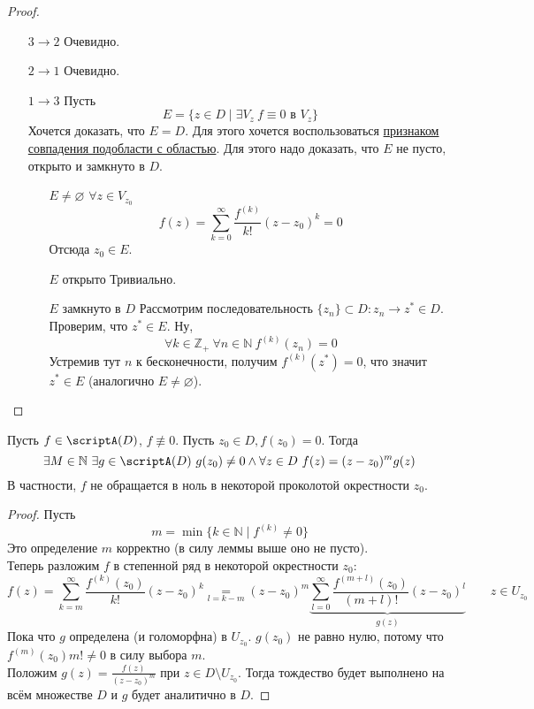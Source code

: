 \documentclass{article}
\begin{document}
    \begin{proof}\mbox{}\\
        \begin{itemize}
            \item[$3\to2$] Очевидно.
            \item[$2\to1$] Очевидно.
            \item[$1\to3$] Пусть
            $$
            E=\{z\in D\mid \exists V_z~f\equiv0\text{ в }V_z\}
            $$
            Хочется доказать, что $E=D$. Для этого хочется воспользоваться \hyperref[Линейно связное пространство связно]{признаком совпадения подобласти с областью}. Для этого надо доказать, что $E$ не пусто, открыто и замкнуто в $D$.
            \begin{itemize}
                \item[$E\neq\varnothing$] $\forall z\in V_{z_0}$
                $$
                f(z)=\sum\limits_{k=0}^\infty\frac{f^{(k)}}{k!}(z-z_0)^k=0
                $$
                Отсюда $z_0\in E$.
                \item[$E$ открыто] Тривиально.
                \item[$E$ замкнуто в $D$] Рассмотрим последовательность $\{z_n\}\subset D:z_n\to z^*\in D$. Проверим, что $z^*\in E$. Ну,
                $$
                \forall k\in\mathbb Z_+~\forall n\in\mathbb N~f^{(k)}(z_n)=0
                $$
                Устремив тут $n$ к бесконечности, получим $f^{(k)}(z^*)=0$, что значит $z^*\in E$ (аналогично $E\neq\varnothing$).
            \end{itemize}
        \end{itemize}
    \end{proof}
    \begin{theorem}
        \label{Изолированность нулей голоморфной функции}
        Пусть $f\in\scriptA(D)$, $f\not\equiv0$. Пусть $z_0\in D,f(z_0)=0$. Тогда
        $$\exists M\in\mathbb N~\exists g\in\scriptA(D)~g(z_0)\neq0\land\forall z\in D~f(z)=(z-z_0)^mg(z)$$
        В частности, $f$ не обращается в ноль в некоторой проколотой окрестности $z_0$.
    \end{theorem}
    \begin{proof}
        Пусть
        $$
        m=\min\{k\in\mathbb N\mid f^{(k)}\neq0\}
        $$
        Это определение $m$ корректно (в силу леммы выше оно не пусто).\\
        Теперь разложим $f$ в степенной ряд в некоторой окрестности $z_0$:
        $$
        f(z)=\sum\limits_{k=m}^\infty\frac{f^{(k)}(z_0)}{k!}(z-z_0)^k\underset{l=k-m}=(z-z_0)^m\underbrace{\sum\limits_{l=0}^\infty\frac{f^{(m+l)}(z_0)}{(m+l)!}(z-z_0)^l}_{g(z)}\qquad z\in U_{z_0}
        $$
        Пока что $g$ определена (и голоморфна) в $U_{z_0}$. $g(z_0)$ не равно нулю, потому что $f^{(m)}(z_0){m!}\neq0$ в силу выбора $m$.\\
        Положим $g(z)=\frac{f(z)}{(z-z_0)^m}$ при $z\in D\setminus U_{z_0}$. Тогда тождество будет выполнено на всём множестве $D$ и $g$ будет аналитично в $D$.
    \end{proof}
\end{document}

